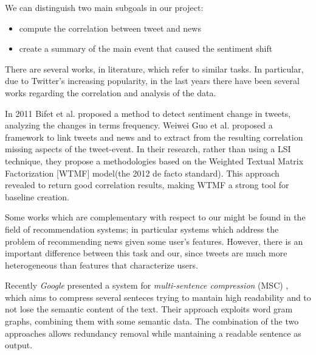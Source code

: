 We can distinguish two main subgoals in our project:
\begin{itemize}
	\item compute the correlation between tweet and news
	\item create a summary of the main event that caused the sentiment shift
\end{itemize}
There are several works, in literature, which refer to similar tasks. 
In particular, due to Twitter's increasing popularity, in the last years there
have been several works regarding the correlation and analysis of the data.

In 2011 Bifet et al.\cite{Bifet} proposed a method to detect sentiment change in
tweets, analyzing the changes in terms frequency.
Weiwei Guo et al.\cite{LTN} proposed a framework to link tweets and news and to
extract from the resulting correlation missing aspects of the tweet-event. 
In their research, rather than using a LSI technique, they propose a
methodologies based on the Weighted Textual Matrix Factorization\cite{WTMF}
[WTMF] model(the 2012 de facto standard). This approach revealed to return
good correlation results, making WTMF a strong tool for baseline creation.

Some works which are complementary with respect to our might be found in the
field of recommendation systems; in particular systems which address the
problem of recommending news given some user's features. However, there is an
important difference between this task and our, since tweets are much more
heterogeneous than features that characterize users.

Recently \emph{Google} presented a system for \emph{multi-sentence compression} (MSC) \cite{MSC}, which aims
to compress several senteces trying to mantain high readability and to not lose
the semantic content of the text. Their approach exploits word gram graphs,
combining them with some semantic data. The combination of the two approaches
allows redundancy removal while mantaining a readable sentence as output.


